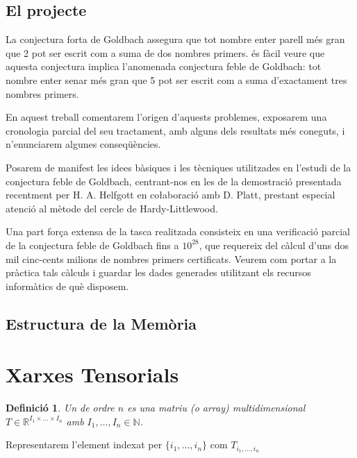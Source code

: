 \documentclass[11pt,a4paper,openright,oneside]{article}
\numberwithin{equation}{section}
\newtheorem{defi}[teo]{Definici\'o}
\theoremstyle{definition}
\begin{document}
\subsection*{El projecte}

La conjectura forta de Goldbach assegura que tot nombre enter parell m\' es gran que 2 pot ser escrit com a suma de dos nombres primers. \'es f\`acil veure que aquesta conjectura implica l'anomenada conjectura feble de Goldbach: tot nombre enter senar m\'es gran que 5 pot ser escrit com a suma d'exactament tres nombres primers.

En aquest treball comentarem l'origen d'aquests problemes, exposarem una cro\-no\-lo\-gia parcial del seu tractament, amb alguns dels resultats m\'es coneguts, i n'enunciarem algunes conseq\"u\`encies.

Posarem de manifest les idees b\`asiques i les t\`ecniques utilitzades en l'estudi de la conjectura feble de Goldbach, centrant-nos en les de la demostraci\'o presentada recentment per H. A. Helfgott en co{\l}aboraci\'o amb D. Platt, prestant especial atenci\'o al m\`etode del cercle de Hardy-Littlewood.

Una part for\c{c}a extensa de la tasca realitzada consisteix en una verificaci\'o parcial de la conjectura feble de Goldbach fins a $10^{28}$, que requereix del c\`alcul d'uns dos mil cinc-cents milions de nombres primers certificats. Veurem com portar a la pr\`actica tals c\`alculs i guardar les dades generades utilitzant els recursos inform\`atics de qu\`e disposem.


\subsection*{Estructura de la Mem\`oria}

\newpage


\section{Xarxes Tensorials}

\begin{defi}
 Un  de ordre $n$ es una matriu (o array) multidimensional $T \in \mathbb{R}^{I_1 \times \dots \times I_n}$ amb $I_1, \dots, I_n \in \mathbb{N}$.
\end{defi}

Representarem l'element indexat per $\{i_1, \dots, i_n\}$ com $T_{i_1, \dots, i_n}$
\end{document}

